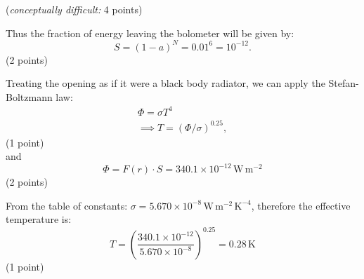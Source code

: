 
\hfill(\emph{conceptually difficult:} 4 points)

Thus the fraction of energy leaving the bolometer will be given by:
\[ S = (1-a)^N = 0.01^6 = 10^{-12}. \]
\hfill(2 points)

Treating the opening as if it were a black body radiator, we can apply the
Stefan-Boltzmann law:
\begin{gather*}
\Phi = \sigma T^4 \\
\implies T = (\Phi/\sigma)^{0.25},
\end{gather*}
\hfill(1 point)\\
and
\[ \Phi = F(r) \cdot S = 340.1 \times 10^{-12}\,\mathrm{W\,m^{-2}} \]
\hfill(2 points)

From the table of constants:
$\sigma = 5.670 \times 10^{-8}\,\mathrm{W\,m^{-2}\,K^{-4}}$, therefore the
effective temperature is:
\[ T = \left(\frac{340.1 \times 10^{-12}}{5.670 \times 10^{-8}}\right)^{0.25}
     = 0.28\,\mathrm{K} \]
\hfill(1 point)

